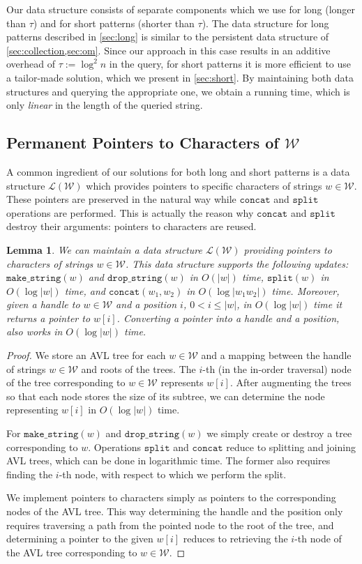 \documentclass[a4paper]{article}
\newtheorem{lemma}[theorem]{Lemma}
\theoremstyle{remark}
\newcommand{\makeop}{\mathtt{make\_string}}
\newcommand{\dropop}{\mathtt{drop\_string}}
\newcommand{\concop}{\mathtt{concat}}
\newcommand{\splitop}{\mathtt{split}}
\newcommand{\coll}{\mathcal{W}}
\begin{document}
Our data structure consists of separate components which we use for long (longer than $\tau$) and for short patterns (shorter than $\tau$).
The data structure for long patterns described in \cref{sec:long} is similar to the persistent data structure of \cref{sec:collection,sec:om}.
Since our approach in this case results in an additive overhead of $\tau := \log^2 n$ in the query, for short patterns it is
more efficient to use a tailor-made solution, which we present in \cref{sec:short}.
By maintaining both data structures and querying the appropriate one, we obtain a running time, which is only \emph{linear} in the length of the queried string.

\newcommand{\lists}{\mathcal{L}}


\subsection{Permanent Pointers to Characters of $\coll$}\label{sec:lists}
A common ingredient of our solutions for both long and short patterns is a data structure $\lists(\coll)$
which provides pointers to specific characters of strings $w\in \coll$.
These pointers are preserved in the natural way while $\concop$ and $\splitop$ operations are performed.
This is actually the reason why $\concop$ and $\splitop$ destroy their arguments: pointers to characters
are reused.

\begin{lemma}\label{lem:lists}
We can maintain a data structure $\lists(\coll)$ providing pointers to characters of strings $w\in \coll$.
This data structure supports the following updates: $\makeop(w)$ and $\dropop(w)$ in $O(|w|)$ time,
$\splitop(w)$ in $O(\log |w|)$ time, and $\concop(w_1,w_2)$ in $O(\log|w_1w_2|)$ time.
Moreover, given a handle to $w\in \coll$ and a position $i$, $0<i\le |w|$, in $O(\log |w|)$ time it returns
a pointer to $w[i]$. Converting a pointer into a handle and a position, also works in $O(\log |w|)$ time.
\end{lemma}
\begin{proof}
We store an AVL tree for each $w\in \coll$ and a mapping between the handle of strings $w\in \coll$ and roots of the trees. The $i$-th (in the in-order traversal) node of the tree corresponding to $w\in \coll$
represents $w[i]$. After augmenting the trees so that each node stores the size of its subtree, we
can determine the node representing $w[i]$ in $O(\log |w|)$ time.

For $\makeop(w)$ and $\dropop(w)$ we simply create or destroy a tree corresponding to $w$.
Operations $\splitop$ and $\concop$ reduce to splitting and joining AVL trees, which can be done in logarithmic time.
The former also requires finding the $i$-th node, with respect to which we perform the split.

We implement pointers to characters simply as pointers to the corresponding nodes of the AVL tree.
This way determining the handle and the position only requires traversing a path from the pointed node to the root of the tree,
and determining a pointer to the given $w[i]$ reduces to retrieving the $i$-th node of the AVL tree
corresponding to $w\in \coll$.
\end{proof}
\end{document}
